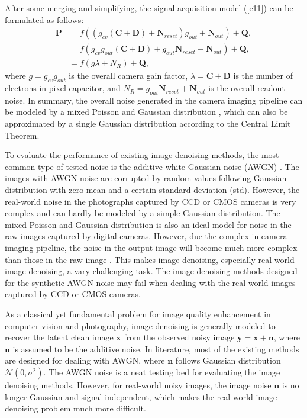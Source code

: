 After some merging and simplifying, the signal acquisition model (\ref{e11}) can be formulated as follows:
\begin{equation}
\label{e12}
\begin{split}
\textbf{P} 
&=f((g_{cv}(\textbf{C}+\textbf{D})+\textbf{N}_{reset})g_{out}+\textbf{N}_{out})+\textbf{Q},
\\
&=f(g_{cv}g_{out}(\textbf{C}+\textbf{D})+g_{out}\textbf{N}_{reset}+\textbf{N}_{out})+\textbf{Q},
\\
&=f(g\lambda+N_{R})+\textbf{Q},
\end{split}
\end{equation}
where $g = g_{cv}g_{out}$ is the overall camera gain factor, $\lambda=\textbf{C}+\textbf{D}$ is the number of electrons in pixel capacitor, and $N_{R}=g_{out}\textbf{N}_{reset}+\textbf{N}_{out}$ is the overall readout noise. In summary, the overall noise generated in the camera imaging pipeline can be modeled by a mixed Poisson and Gaussian distribution \cite{Foipractical}, which can also be approximated by a single Gaussian distribution according to the Central Limit Theorem.

To evaluate the performance of existing image denoising methods, the most common type of tested noise is the additive white Gaussian noise (AWGN) \cite{bm3d,ksvd}. The images with AWGN noise are corrupted by random values following Gaussian distribution with zero mean and a certain standard deviation (std). However, the real-world noise in the photographs captured by CCD or CMOS cameras is very complex and can hardly be modeled by a simple Gaussian distribution. The mixed Poisson and Gaussian distribution \cite{Foipractical} is also an ideal model for noise in the raw images captured by digital cameras. However, due the complex in-camera imaging pipeline, the noise in the output image will become much more complex than those in the raw image \cite{crosschannel2016,karaimer_brown_ECCV_2016}. This makes image denoising, especially real-world image denoising, a vary challenging task. The image denoising methods designed for the synthetic AWGN noise may fail when dealing with the real-world images captured by CCD or CMOS cameras.


As a classical yet fundamental problem for image quality enhancement in computer vision and photography, image denoising is generally modeled to recover the latent clean image $\bm{x}$ from the observed noisy image $\bm{y}=\bm{x}+\bm{n}$, where $\bm{n}$ is assumed to be the additive noise. In literature, most of the existing methods are designed for dealing with AWGN, where $\bm{n}$ follows Gaussian distribution $\mathcal{N}(0,\sigma^{2})$. The AWGN noise is a neat testing bed for evaluating the image denoising methods. However, for real-world noisy images, the image noise $\bm{n}$ is no longer Gaussian and signal independent, which makes the real-world image denoising problem much more difficult.


